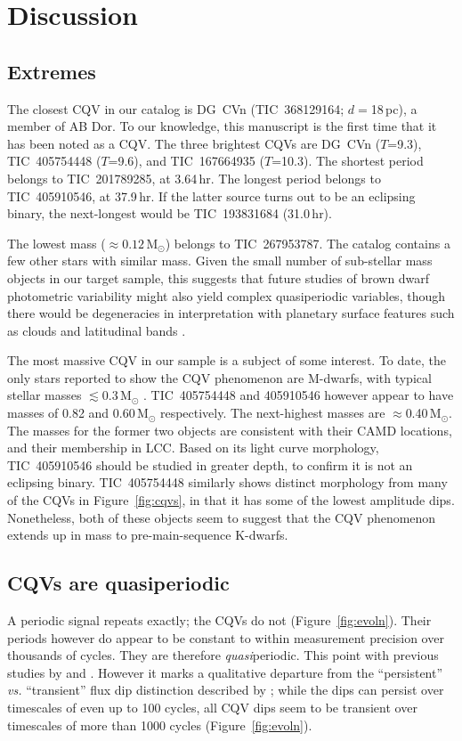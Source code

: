 \documentclass[11pt,twocolumn,tighten]{aastex63}
\begin{document}
\section{Discussion}
\label{sec:discussion}

\subsection{Extremes}
The closest CQV in our catalog is DG~CVn (TIC~368129164;
$d$$=$18\,pc), a member of AB Dor.  To our knowledge,
this manuscript is the first time that it has been noted as a CQV.
The three brightest CQVs are DG~CVn ($T$=9.3),
TIC~405754448 ($T$=9.6), and TIC~167664935 ($T$=10.3).
The shortest period belongs to TIC~201789285, at 3.64\,hr.
The longest period belongs to TIC~405910546, at 37.9\,hr.  If
the latter source turns out to be an eclipsing binary, the next-longest
would be TIC~193831684 (31.0\,hr).

The lowest mass ($\approx 0.12$\,M$_\odot$) belongs to TIC~267953787.
The catalog contains a few other stars with similar mass.
Given the small number of sub-stellar mass objects in our target sample,
this suggests that future studies of brown dwarf
photometric variability might also yield complex quasiperiodic
variables, though there would be degeneracies in interpretation with planetary surface features such
as clouds and latitudinal bands \citep[e.g.][]{2021ApJ...906...64A,2022ApJ...924...68V}.

The most massive CQV in our sample is a subject of some interest.
To date, the only stars reported to show the CQV phenomenon
are M-dwarfs, with typical stellar masses $\lesssim$0.3\,M$_\odot$
\citep{2022AJ....163..144G}.  TIC~405754448 and 405910546 however
appear to have masses of 0.82 and 0.60\,M$_\odot$ respectively.  The
next-highest masses are $\approx$0.40\,M$_\odot$.  The masses for the
former two objects are consistent with their CAMD locations, and their
membership in LCC.  Based on its light curve morphology, TIC~405910546
should be studied in greater depth, to confirm it is not an eclipsing
binary.  TIC~405754448 similarly shows distinct morphology from many
of the CQVs in Figure~\ref{fig:cqvs}, in that it has some of the
lowest amplitude dips.  Nonetheless, both of these objects seem to
suggest that the CQV phenomenon extends up in mass to
pre-main-sequence K-dwarfs.


\subsection{CQVs are quasiperiodic}
A periodic signal repeats exactly; the CQVs do not (Figure~\ref{fig:evoln}).
Their periods
however do appear to be constant to within measurement precision over
thousands of cycles.  They are therefore {\it quasi}periodic.  
This point with previous studies by
\citet{2022AJ....163..144G} and \citet{2023ApJ...945..114P}.
However it marks a qualitative
departure from the ``persistent'' {\it vs.} ``transient'' flux dip
distinction described by \citet{2017AJ....153..152S};  while the dips
can persist over timescales of even up to 100 cycles, all CQV dips
seem to be transient over timescales of more than 1000 cycles
(Figure~\ref{fig:evoln}).
\end{document}
